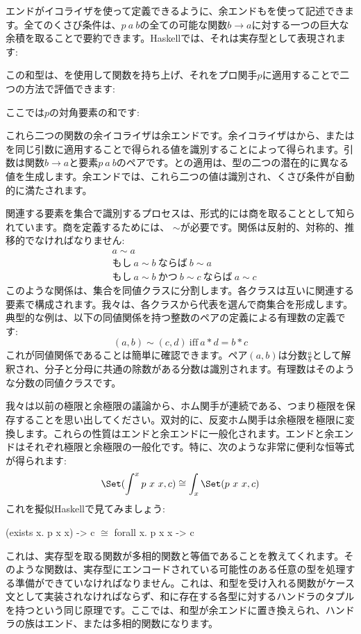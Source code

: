 エンドがイコライザを使って定義できるように、余エンドもを使って記述できます。全てのくさび条件は、$p\ a\ b$の全ての可能な関数$b \to a$に対する一つの巨大な余積を取ることで要約できます。Haskellでは、それは実存型として表現されます: 

この和型は、を使用して関数を持ち上げ、それをプロ関手$p$に適用することで二つの方法で評価できます: 

ここでは$p$の対角要素の和です: 

これら二つの関数の余イコライザは余エンドです。余イコライザはから、またはを同じ引数に適用することで得られる値を識別することによって得られます。引数は関数$b \to a$と要素$p\ a\ b$のペアです。との適用は、型の二つの潜在的に異なる値を生成します。余エンドでは、これら二つの値は識別され、くさび条件が自動的に満たされます。

関連する要素を集合で識別するプロセスは、形式的には商を取ることとして知られています。商を定義するためには、 $\sim$が必要です。関係は反射的、対称的、推移的でなければなりません: 
\begin{align*}
   & a \sim a                                                         \\
   & \text{もし}\ a \sim b\ \text{ならば}\ b \sim a                       \\
   & \text{もし}\ a \sim b\ \text{かつ}\ b \sim c\ \text{ならば}\ a \sim c
\end{align*}
このような関係は、集合を同値クラスに分割します。各クラスは互いに関連する要素で構成されます。我々は、各クラスから代表を選んで商集合を形成します。典型的な例は、以下の同値関係を持つ整数のペアの定義による有理数の定義です: 
\[(a, b) \sim (c, d)\ \text{iff}\ a * d = b * c\]
これが同値関係であることは簡単に確認できます。ペア$(a, b)$は分数$\frac{a}{b}$として解釈され、分子と分母に共通の除数がある分数は識別されます。有理数はそのような分数の同値クラスです。

我々は以前の極限と余極限の議論から、ホム関手が連続である、つまり極限を保存することを思い出してください。双対的に、反変ホム関手は余極限を極限に変換します。これらの性質はエンドと余エンドに一般化されます。エンドと余エンドはそれぞれ極限と余極限の一般化です。特に、次のような非常に便利な恒等式が得られます: 
\[\Set(\int^x p\ x\ x, c) \cong \int_x \Set(p\ x\ x, c)\]
これを擬似Haskellで見てみましょう: 

\begin{snipv}
(exists x. p x x) -> c \ensuremath{\cong} forall x. p x x -> c
\end{snipv}
これは、実存型を取る関数が多相的関数と等価であることを教えてくれます。そのような関数は、実存型にエンコードされている可能性のある任意の型を処理する準備ができていなければなりません。これは、和型を受け入れる関数がケース文として実装されなければならず、和に存在する各型に対するハンドラのタプルを持つという同じ原理です。ここでは、和型が余エンドに置き換えられ、ハンドラの族はエンド、または多相的関数になります。

